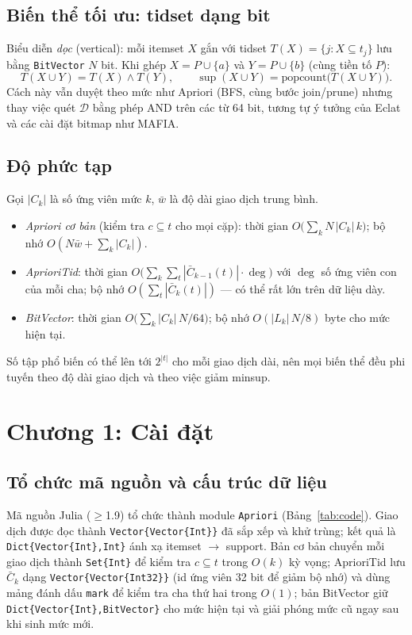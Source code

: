 \documentclass[10pt,twocolumn,letterpaper]{article}
\renewcommand{\sup}{\operatorname{sup}}
\newcommand{\D}{\mathcal{D}}
\begin{document}
\subsection{Biến thể tối ưu: tidset dạng bit}
Biểu diễn \emph{dọc} (vertical): mỗi itemset $X$ gắn với tidset $T(X)=\{j: X\subseteq t_j\}$ lưu bằng \texttt{BitVector} $N$ bit. Khi ghép $X=P\cup\{a\}$ và $Y=P\cup\{b\}$ (cùng tiền tố $P$):
\begin{equation}
T(X\cup Y)=T(X)\wedge T(Y),\qquad \sup(X\cup Y)=\mathrm{popcount}\big(T(X\cup Y)\big).
\end{equation}
Cách này vẫn duyệt theo mức như Apriori (BFS, cùng bước join/prune) nhưng thay việc quét $\D$ bằng phép AND trên các từ 64 bit, tương tự ý tưởng của Eclat~\cite{zaki2000} và các cài đặt bitmap như MAFIA.

\subsection{Độ phức tạp}
Gọi $|C_k|$ là số ứng viên mức $k$, $\bar w$ là độ dài giao dịch trung bình.
\begin{itemize}
\item \emph{Apriori cơ bản} (kiểm tra $c\subseteq t$ cho mọi cặp): thời gian $O\!\big(\sum_k N\,|C_k|\,k\big)$; bộ nhớ $O(N\bar w+\sum_k|C_k|)$.
\item \emph{AprioriTid}: thời gian $O\!\big(\sum_k\sum_t|\bar{C}_{k-1}(t)|\cdot\deg\big)$ với $\deg$ số ứng viên con của mỗi cha; bộ nhớ $O(\sum_t|\bar{C}_k(t)|)$ — có thể rất lớn trên dữ liệu dày.
\item \emph{BitVector}: thời gian $O\!\big(\sum_k |C_k|\,N/64\big)$; bộ nhớ $O(|L_k|\,N/8)$ byte cho mức hiện tại.
\end{itemize}
Số tập phổ biến có thể lên tới $2^{|t|}$ cho mỗi giao dịch dài, nên mọi biến thể đều phi tuyến theo độ dài giao dịch và theo việc giảm minsup.

\section{Chương 1: Cài đặt}\label{sec:impl}
\subsection{Tổ chức mã nguồn và cấu trúc dữ liệu}
Mã nguồn Julia ($\geq$1.9) tổ chức thành module \texttt{Apriori} (Bảng~\ref{tab:code}). Giao dịch được đọc thành \texttt{Vector\{Vector\{Int\}\}} đã sắp xếp và khử trùng; kết quả là \texttt{Dict\{Vector\{Int\},Int\}} ánh xạ itemset $\to$ support. Bản cơ bản chuyển mỗi giao dịch thành \texttt{Set\{Int\}} để kiểm tra $c\subseteq t$ trong $O(k)$ kỳ vọng; AprioriTid lưu $\bar{C}_k$ dạng \texttt{Vector\{Vector\{Int32\}\}} (id ứng viên 32 bit để giảm bộ nhớ) và dùng mảng đánh dấu \texttt{mark} để kiểm tra cha thứ hai trong $O(1)$; bản BitVector giữ \texttt{Dict\{Vector\{Int\},BitVector\}} cho mức hiện tại và giải phóng mức cũ ngay sau khi sinh mức mới.
\end{document}

